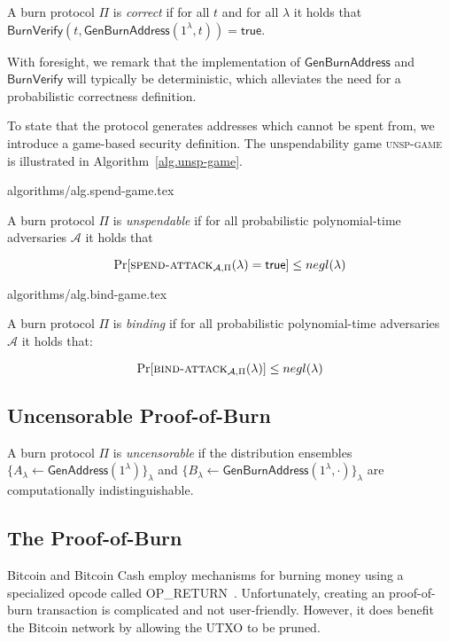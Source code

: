 \begin{definition}[Correctness]
  A burn protocol $\Pi$ is \emph{correct} if for all $t$ and for all $\lambda$ it holds that
  $\mathsf{BurnVerify}(t, \mathsf{GenBurnAddress}(1^\lambda, t)) = \textsf{true}$.
\end{definition}

With foresight, we remark that the implementation of $\mathsf{GenBurnAddress}$ and $\mathsf{BurnVerify}$ will typically be deterministic, which alleviates the need for a probabilistic correctness definition.

To state that the protocol generates addresses which cannot be spent from, we introduce a game-based security definition. The unspendability game \textsc{unsp-game} is illustrated in Algorithm~\ref{alg.unsp-game}.

{algorithms/alg.spend-game.tex}

\begin{definition}[Unspendability]
  A burn protocol $\Pi$ is \emph{unspendable} if
  for all probabilistic polynomial-time adversaries $\mathcal{A}$
  it holds that

  \[
    \Pr[\textsc{spend-attack}_{\mathcal{A},
    \Pi}(\lambda) = \textsf{true}] \leq negl(\lambda)
  \]
\end{definition}

{algorithms/alg.bind-game.tex}

\begin{definition}[Binding]
  A burn protocol $\Pi$ is \emph{binding} if
  for all probabilistic polynomial-time adversaries $\mathcal{A}$ it holds that:

  \[
    \Pr[\textsc{bind-attack}_{\mathcal{A},\Pi}(\lambda)] \leq negl(\lambda)
  \]
\end{definition}

\subsection{Uncensorable Proof-of-Burn}

\begin{definition}[Uncensorability]
  A burn protocol $\Pi$ is \emph{uncensorable} if
  the distribution ensembles $\{A_\lambda \gets \mathsf{GenAddress}(1^\lambda)\}_\lambda$ and
  $\{B_\lambda \gets \mathsf{GenBurnAddress}(1^\lambda, \cdot)\}_\lambda$ are computationally indistinguishable.
\end{definition}

\subsection{The Proof-of-Burn}
Bitcoin and Bitcoin Cash employ mechanisms for burning money using a specialized
opcode called \textsf{OP\_RETURN}~\cite{bartoletti2017analysis}. Unfortunately,
creating an  proof-of-burn transaction is complicated and not
user-friendly. However, it does benefit the Bitcoin network by allowing the UTXO
to be pruned.


